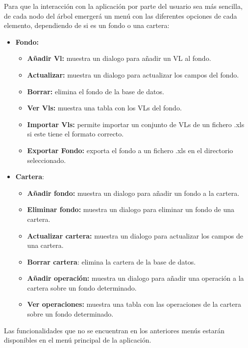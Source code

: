 \documentclass[12pt, a4paper]{book}
\begin{document}
Para que la interacción con la aplicación por parte del usuario sea más sencilla, de cada nodo del árbol emergerá un menú con las diferentes opciones de cada elemento, dependiendo de si es un fondo o una cartera:

\begin{itemize}
	\item \textbf{Fondo:}
	\begin{itemize}
		\item \textbf{Añadir Vl:} muestra un dialogo para añadir un \gls{VL} al fondo.
		\item \textbf{Actualizar:} muestra un dialogo para actualizar los campos del fondo.
		\item \textbf{Borrar:} elimina el fondo de la base de datos.
		\item \textbf{Ver Vls:} muestra una tabla con los \gls{VL}s del fondo.
		\item \textbf{Importar Vls:} permite importar un conjunto de \gls{VL}s de un fichero .xls si este tiene el formato correcto.
		\item \textbf{Exportar Fondo:} exporta el fondo a un fichero .xls en el directorio seleccionado.
	\end{itemize}
\end{itemize}
\newpage
\begin{itemize}
	\item \textbf{Cartera}:
	\begin{itemize}
		\item\textbf{Añadir fondo:} muestra un dialogo para añadir un fondo a la cartera.
		\item \textbf{Eliminar fondo:} muestra un dialogo para eliminar un fondo de una cartera.
		\item \textbf{Actualizar cartera:} muestra un dialogo para actualizar los campos de una cartera.
		\item \textbf{Borrar cartera}: elimina la cartera de la base de datos.
		\item \textbf{Añadir operación:} muestra un dialogo para añadir una operación a la cartera sobre un fondo determinado.
		\item \textbf{Ver operaciones:} muestra una tabla con las operaciones de la cartera sobre un fondo determinado.\\
	\end{itemize}
\end{itemize}

Las funcionalidades que no se encuentran en los anteriores menús estarán disponibles en el menú principal de la aplicación.
\end{document}
